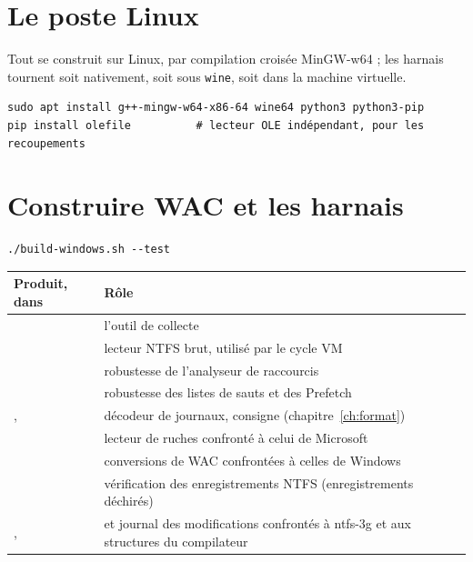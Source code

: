 \documentclass[11pt,a4paper,oneside]{report}
\begin{document}
\section{Le poste Linux}

Tout se construit sur Linux, par compilation croisée MinGW-w64 ; les harnais
tournent soit nativement, soit sous \texttt{wine}, soit dans la machine
virtuelle.

\begin{lstlisting}
sudo apt install g++-mingw-w64-x86-64 wine64 python3 python3-pip
pip install olefile          # lecteur OLE indépendant, pour les recoupements
\end{lstlisting}

\section{Construire WAC et les harnais}

\begin{lstlisting}
./build-windows.sh --test
\end{lstlisting}

\begin{longtable}{@{}L{7.4cm}L{7.6cm}@{}}
\toprule
\textbf{Produit, dans } & \textbf{Rôle} \\
\midrule
\endhead
{} & l'outil de collecte \\
 & lecteur NTFS brut, utilisé par le cycle VM \\
 & robustesse de l'analyseur de raccourcis \\
 & robustesse des listes de sauts et des Prefetch \\
,  & décodeur de journaux, consigne (chapitre~\ref{ch:format}) \\
 & lecteur de ruches confronté à celui de Microsoft \\
 & conversions de WAC confrontées à celles de Windows \\
 & vérification des enregistrements NTFS (enregistrements déchirés) \\
,  &  et journal des modifications confrontés à ntfs-3g et aux structures du compilateur \\
\bottomrule
\end{longtable}
\end{document}
